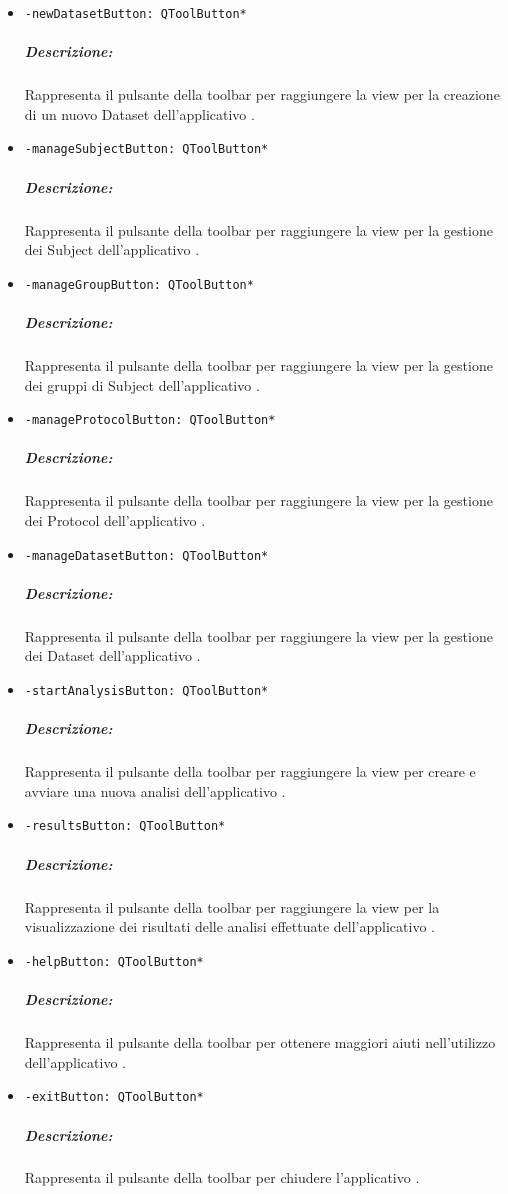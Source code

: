\begin{itemize}
\item \color{teal}\verb!-newDatasetButton: QToolButton*!
\color{black}
\subparagraph{Descrizione:} Rappresenta il pulsante della toolbar per raggiungere la view per la creazione di un nuovo Dataset\g{} dell'applicativo \project{}.

\item \color{teal}\verb!-manageSubjectButton: QToolButton*!
\color{black}
\subparagraph{Descrizione:} Rappresenta il pulsante della toolbar per raggiungere la view per la gestione dei Subject\g{} dell'applicativo \project{}.

\item \color{teal}\verb!-manageGroupButton: QToolButton*!
\color{black}
\subparagraph{Descrizione:} Rappresenta il pulsante della toolbar per raggiungere la view per la gestione dei gruppi di Subject\g{} dell'applicativo \project{}.

\item \color{teal}\verb!-manageProtocolButton: QToolButton*!
\color{black}
\subparagraph{Descrizione:} Rappresenta il pulsante della toolbar per raggiungere la view per la gestione dei Protocol\g{} dell'applicativo \project{}.

\item \color{teal}\verb!-manageDatasetButton: QToolButton*!
\color{black}
\subparagraph{Descrizione:} Rappresenta il pulsante della toolbar per raggiungere la view per la gestione dei Dataset\g{} dell'applicativo \project{}.

\item \color{teal}\verb!-startAnalysisButton: QToolButton*!
\color{black}
\subparagraph{Descrizione:} Rappresenta il pulsante della toolbar per raggiungere la view per creare e avviare una nuova analisi dell'applicativo \project{}.

\item \color{teal}\verb!-resultsButton: QToolButton*!
\color{black}
\subparagraph{Descrizione:} Rappresenta il pulsante della toolbar per raggiungere la view per la visualizzazione dei risultati delle analisi effettuate dell'applicativo \project{}.

\item \color{teal}\verb!-helpButton: QToolButton*!
\color{black}
\subparagraph{Descrizione:} Rappresenta il pulsante della toolbar per ottenere maggiori aiuti nell'utilizzo dell'applicativo \project{}.

\item \color{teal}\verb!-exitButton: QToolButton*!
\color{black}
\subparagraph{Descrizione:} Rappresenta il pulsante della toolbar per chiudere l'applicativo \project{}.
\end{itemize}

